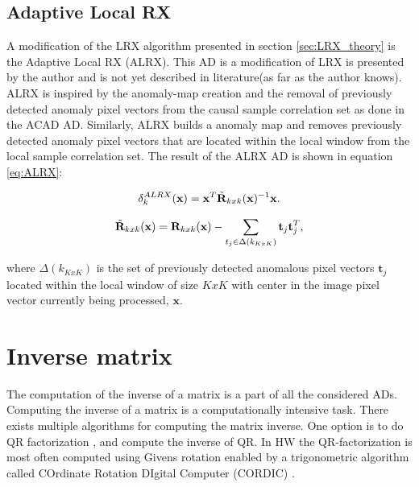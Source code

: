 

\subsection{Adaptive Local RX}
\label{sec:Adaptive_LRX_theory}
A modification of the LRX algorithm presented in section \ref{sec:LRX_theory} is the Adaptive Local RX (ALRX). This AD is a modification of LRX is presented by the author and is not yet described in literature(as far as the author knows). 
\\

ALRX is inspired by the anomaly-map creation and the removal of previously detected anomaly pixel vectors from the causal sample correlation set as done in the ACAD AD. Similarly, ALRX builds a anomaly map and removes previously detected anomaly pixel vectors that are located within the local window from the local sample correlation set. The result of the ALRX AD is shown in equation \ref{eq:ALRX}: 

\begin{equation}
    \delta_k^{ALRX}(\textbf{x}) = \textbf{x}^T\Tilde{\textbf{R}}_{k x k}(\textbf{x})^{-1}\textbf{x}.
    \label{eq:ALRX}
\end{equation}


\begin{equation}
   \Tilde{\textbf{R}}_{k x k}(\textbf{x})= \textbf{R}_{k x k}(\textbf{x})-\sum_{t_j\in\Delta(k_{KxK})}\textbf{t}_j\textbf{t}_j^T,
    \label{eq:ALRX_anomaly_removed}
\end{equation}

where $\Delta(k_{KxK})$ is the set of previously detected anomalous pixel vectors $\textbf{t}_j$ located within the local window of size $KxK$ with center in the image pixel vector currently being processed, $\textbf{x}$.

\section{Inverse matrix}
The computation of the inverse of a matrix is a part of all the considered ADs. Computing the inverse of a matrix is a computationally intensive task. There exists multiple algorithms for computing the matrix inverse. One option is to do QR factorization \cite{QRD_fpga}, and compute the inverse of QR. In HW the QR-factorization is most often computed using Givens rotation enabled by a trigonometric algorithm called COrdinate Rotation DIgital Computer (CORDIC) \cite{CORDIC}. \\

